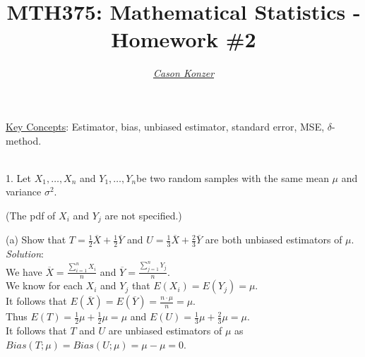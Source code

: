 \documentclass[12pt]{article}
\newcommand{\XB}{\color{black}}
\newcommand{\XBB}{\color{blue}}
\newcommand{\XV}{\color{violet}}
\begin{document}
\title{\textbf{MTH375}: Mathematical Statistics - Homework \#2}
\date{}
\author{\XV\textit{\large{\href{https://github.com/casonk}{Cason Konzer}}}\XB}

\maketitle
\hrulefill
\vfill 
    \underline{Key Concepts}:  Estimator, bias, unbiased estimator, standard error, MSE, $\delta$-method.

\newpage
\newpage
\XBB\hrulefill\XB \\

1. Let $ X_{1}, \dots , X_{n} $ and $ Y_{1}, \dots , Y_{n} $be two random samples with the same mean $ \mu $ and variance $ \sigma^2 $.

(The pdf of $ X_{i} $ and $ Y_{j} $ are not specified.)

\XBB\hrulefill\XB 
\vspace{5mm}

(a) Show that $ T = \frac{1}{2}\overline{X} + \frac{1}{2}\overline{Y} $ and $ U = \frac{1}{3}\overline{X} + \frac{2}{3}\overline{Y} $ are both unbiased estimators of $ \mu $.
\vspace{2.5mm} \\
\textit{Solution}:
\vspace{2.5mm} \\

\noindent
We have $ \displaystyle \overline{X} = \frac{\sum_{i=1}^{n} X_{i}}{n} $ and $ \displaystyle \overline{Y} = \frac{\sum_{j=1}^{n} Y_{j}}{n} $. \\

\noindent
We know for each $ X_{i} $ and $ Y_{j} $ that $ E(X_{i}) = E(Y_{j}) = \mu $. \\

\noindent
It follows that $ \displaystyle E(\overline{X}) = E(\overline{Y}) = \frac{n \cdot \mu}{n} = \mu $. \\

\noindent
Thus $ \displaystyle E(T) = \frac{1}{2}\mu + \frac{1}{2}\mu = \mu $ and $ \displaystyle  E(U) = \frac{1}{3}\mu + \frac{2}{3}\mu = \mu $. \\

\noindent
It follows that $ T $ and $ U $ are unbiased estimators of $ \mu $ as $ Bias(T;\mu) = Bias(U;\mu) = \mu - \mu = 0 $. \\
\end{document}
